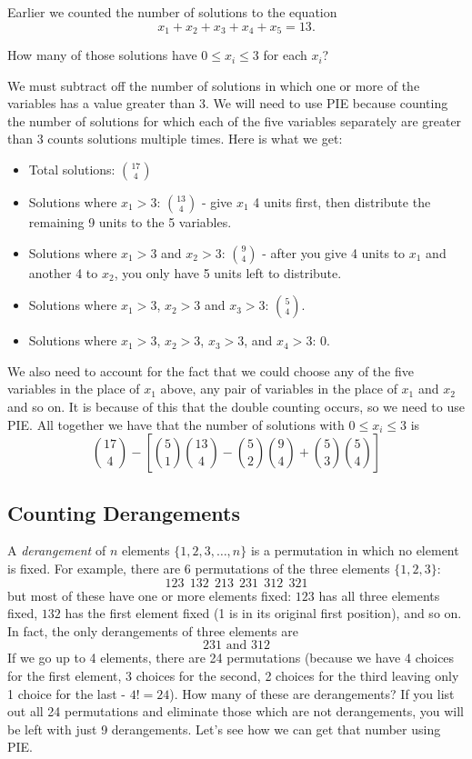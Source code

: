 \documentclass[12pt]{article}
\begin{document}
\begin{example}
Earlier we counted the number of solutions to the equation
\[x_1 + x_2 + x_3 + x_4 + x_5 = 13.\]

How many of those solutions have $0 \le x_i \le 3$ for each $x_i$? 


\begin{solution}
 We must subtract off the number of solutions in which one or more of the variables has a value greater than 3.  We will need to use PIE because counting the number of solutions for which each of the five variables separately are greater than 3 counts solutions multiple times.  Here is what we get:
    \begin{itemize}
      \item Total solutions: ${17 \choose 4}$
      \item Solutions where $x_1 > 3$: ${13 \choose 4}$ - give $x_1$ 4 units first, then distribute the remaining 9 units to the 5 variables.
      \item Solutions where $x_1 > 3$ and $x_2 > 3$: ${9 \choose 4}$ - after you give 4 units to $x_1$ and another 4 to $x_2$, you only have 5 units left to distribute.
      \item Solutions where $x_1 > 3$, $x_2 > 3$ and $x_3 > 3$: ${5 \choose 4}$.
      \item Solutions where $x_1 > 3$, $x_2 > 3$, $x_3 > 3$, and $x_4 > 3$: 0.
    \end{itemize}
    We also need to account for the fact that we could choose any of the five variables in the place of $x_1$ above, any pair of variables in the place of $x_1$ and $x_2$ and so on.  It is because of this that the double counting occurs, so we need to use PIE.  All together we have that the number of solutions with $0 \le x_i \le 3$ is
    \[{17 \choose 4} - \left[{5\choose 1}{13 \choose 4} - {5 \choose 2}{9 \choose 4} + {5 \choose 3}{5 \choose 4}\right]\]
  \end{solution}
\end{example}





\subsection{Counting Derangements}

A {\em derangement} of $n$ elements $\{1,2,3,\ldots, n\}$ is a permutation in which no element is fixed.  For example, there are $6$ permutations of the three elements $\{1,2,3\}$:
\[123 ~~ 132 ~~ 213 ~~ 231 ~~ 312 ~~ 321\]
but most of these have one or more elements fixed: $123$ has all three elements fixed, $132$ has the first element fixed (1 is in its original first position), and so on.  In fact, the only derangements of three elements are
\[231 \mbox{  and  }312\]
If we go up to 4 elements, there are 24 permutations (because we have 4 choices for the first element, 3 choices for the second, 2 choices for the third leaving only 1 choice for the last - $4! = 24$).  How many of these are derangements?  If you list out all 24 permutations and eliminate those which are not derangements, you will be left with just 9 derangements.  Let's see how we can get that number using PIE.
\end{document}
